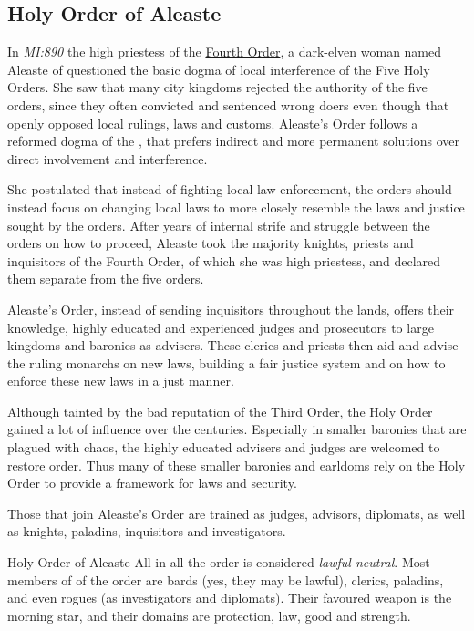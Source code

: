 \subsection{Holy Order of Aleaste}
\label{sec:Holy Order of Aleaste}

In \emph{MI:890} the high priestess of the
\hyperref[sec:Four Holy Orders]{Fourth Order}, a dark-elven woman named
Aleaste of  questioned the basic dogma of local
interference of the Five Holy Orders. She saw that many city kingdoms rejected
the authority of the five orders, since they often convicted and sentenced
wrong doers even though that openly opposed local rulings, laws and customs.
Aleaste's Order follows a reformed dogma of the , that
prefers indirect and more permanent solutions over direct involvement and
interference.

She postulated that instead of fighting local law enforcement, the orders
should instead focus on changing local laws to more closely resemble the laws
and justice sought by the orders. After years of internal strife and struggle
between the orders on how to proceed, Aleaste took the majority knights, priests
and inquisitors of the Fourth Order, of which she was high priestess, and
declared them separate from the five orders.

Aleaste's Order, instead of sending inquisitors throughout the lands, offers
their knowledge, highly educated and experienced judges and prosecutors to
large kingdoms and baronies as advisers. These clerics and priests then aid
and advise the ruling monarchs on new laws, building a fair justice system and
on how to enforce these new laws in a just manner.

Although tainted by the bad reputation of the Third Order, the Holy Order
gained a lot of influence over the centuries. Especially in smaller baronies
that are plagued with chaos, the highly educated advisers and judges are
welcomed to restore order. Thus many of these smaller baronies and earldoms
rely on the Holy Order to provide a framework for laws and security.

Those that join Aleaste's Order are trained as judges, advisors, diplomats, as
well as knights, paladins, inquisitors and investigators.

\begin{35e}{Holy Order of Aleaste}
  All in all the order is considered \emph{lawful neutral}. Most members of
  of the order are bards (yes, they may be lawful), clerics, paladins, and even
  rogues (as investigators and diplomats). Their favoured weapon is the morning
  star, and their domains are protection, law, good and strength.
\end{35e}
